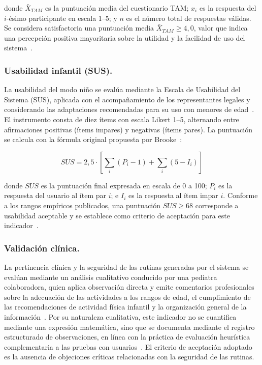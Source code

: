 					donde $\bar{X}_{TAM}$ es la puntuación media del cuestionario TAM; $x_i$ es la respuesta del $i$-ésimo participante en escala 1--5; y $n$ es el número total de respuestas válidas. Se considera satisfactoria una puntuación media $\bar{X}_{TAM} \geq 4{,}0$, valor que indica una percepción positiva mayoritaria sobre la utilidad y la facilidad de uso del sistema~\cite{Venkatesh2003}.
			
				\subsubsection{Usabilidad infantil (SUS).}
					La usabilidad del modo niño se evalúa mediante la Escala de Usabilidad del Sistema (SUS), aplicada con el acompañamiento de los representantes legales y considerando las adaptaciones recomendadas para su uso con menores de edad~\cite{Bangor2009,Hourcade2015}. El instrumento consta de diez ítems con escala Likert 1--5, alternando entre afirmaciones positivas (ítems impares) y negativas (ítems pares). La puntuación se calcula con la fórmula original propuesta por Brooke~\cite{Brooke1996}:
					
					\begin{equation}
						\label{ec:SUS}
						SUS = 2{,}5 \cdot \left[\sum_{i} (P_i - 1) + \sum_{i} (5 - I_i)\right]
					\end{equation}
					
					donde $SUS$ es la puntuación final expresada en escala de 0 a 100; $P_i$ es la respuesta del usuario al ítem par $i$; e $I_i$ es la respuesta al ítem impar $i$. Conforme a los rangos empíricos publicados, una puntuación $SUS \geq 68$ corresponde a usabilidad aceptable y se establece como criterio de aceptación para este indicador~\cite{Bangor2009}.
			
				\subsubsection{Validación clínica.}
					La pertinencia clínica y la seguridad de las rutinas generadas por el sistema se evalúan mediante un análisis cualitativo conducido por una pediatra colaboradora, quien aplica observación directa y emite comentarios profesionales sobre la adecuación de las actividades a los rangos de edad, el cumplimiento de las recomendaciones de actividad física infantil y la organización general de la información~\cite{Bull2020,Yim2024}. Por su naturaleza cualitativa, este indicador no se cuantifica mediante una expresión matemática, sino que se documenta mediante el registro estructurado de observaciones, en línea con la práctica de evaluación heurística complementaria a las pruebas con usuarios~\cite{Nielsen1994}. El criterio de aceptación adoptado es la ausencia de objeciones críticas relacionadas con la seguridad de las rutinas.
			
